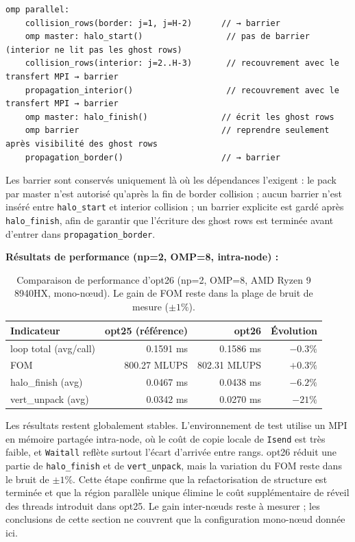 \documentclass[a4paper,11pt,oneside]{report}
\newcommand{\code}[1]{\texttt{#1}}
\begin{document}
\begin{lstlisting}[language={}]
omp parallel:
    collision_rows(border: j=1, j=H-2)      // → barrier
    omp master: halo_start()                 // pas de barrier (interior ne lit pas les ghost rows)
    collision_rows(interior: j=2..H-3)       // recouvrement avec le transfert MPI → barrier
    propagation_interior()                   // recouvrement avec le transfert MPI → barrier
    omp master: halo_finish()               // écrit les ghost rows
    omp barrier                             // reprendre seulement après visibilité des ghost rows
    propagation_border()                    // → barrier
\end{lstlisting}

Les barrier sont conservés uniquement là où les dépendances l'exigent : le pack par
master n'est autorisé qu'après la fin de border collision ; aucun barrier n'est inséré entre \code{halo\_start} et interior collision ;
un barrier explicite est gardé après \code{halo\_finish}, afin de garantir que l'écriture des ghost rows est terminée avant d'entrer dans
\code{propagation\_border}.

\textbf{Résultats de performance (np=2, OMP=8, intra-node) :}

\begin{table}[H]
\centering
\begin{tabular}{@{}lrrr@{}}
\toprule
\textbf{Indicateur} & \textbf{opt25 (référence)} & \textbf{opt26} & \textbf{Évolution} \\
\midrule
loop total (avg/call) & 0.1591 ms & 0.1586 ms & $-0.3\%$ \\
FOM & 800.27 MLUPS & 802.31 MLUPS & \textbf{$+0.3\%$} \\
halo\_finish (avg) & 0.0467 ms & 0.0438 ms & $-6.2\%$ \\
vert\_unpack (avg) & 0.0342 ms & 0.0270 ms & $-21\%$ \\
\bottomrule
\end{tabular}
\caption{Comparaison de performance d'opt26 (np=2, OMP=8, AMD Ryzen 9 8940HX, mono-nœud).
Le gain de FOM reste dans la plage de bruit de mesure ($\pm 1\%$).}
\end{table}

Les résultats restent globalement stables. L'environnement de test utilise un MPI en mémoire partagée intra-node, où le coût de copie locale de \code{Isend} est très faible,
et \code{Waitall} reflète surtout l'écart d'arrivée entre rangs. opt26 réduit une partie de \code{halo\_finish} et de
\code{vert\_unpack}, mais la variation du FOM reste dans le bruit de $\pm 1\%$.
Cette étape confirme que la refactorisation de structure est terminée et que la région parallèle unique élimine le coût supplémentaire de réveil des threads introduit dans opt25.
Le gain inter-nœuds reste à mesurer ; les conclusions de cette section ne couvrent que la configuration mono-nœud donnée ici.
\end{document}
